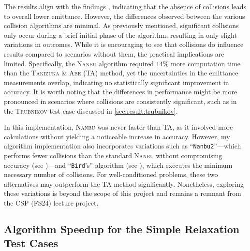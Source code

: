 The results align with the findings \cite[595]{Mitchell2015}, indicating that the absence of collisions leads to overall lower emittance. However, the differences observed between the various collision algorithms are minimal. As previously mentioned, significant collisions only occur during a brief initial phase of the algorithm, resulting in only slight variations in outcomes. While it is encouraging to see that collisions do influence results compared to scenarios without them, the practical implications are limited. Specifically, the \textsc{Nanbu} algorithm required $14\%$ more computation time than the \textsc{Takizuka \& Abe} (TA) method, yet the uncertainties in the emittance measurements overlap, indicating no statistically significant improvement in accuracy. It is worth noting that the differences in performance might be more pronounced in scenarios where collisions are consistently significant, such as in the \textsc{Trubnikov} test case discussed in \ref{sec:result:trubnikov}. 

In this implementation, \textsc{Nanbu} was never faster than TA, as it involved more calculations without yielding a noticeable increase in accuracy. However, my algorithm implementation also incorporates variations such as ``\texttt{Nanbu2}''—which performs fewer collisions than the standard \textsc{Nanbu} without compromising accuracy (see \cite[7]{Dimarco2010})—and ``\texttt{Bird}'s'' algorithm (see \cite[8]{Dimarco2010}), which executes the minimum necessary number of collisions. For well-conditioned problems, these two alternatives may outperform the TA method significantly. Nonetheless, exploring these variations is beyond the scope of this project and remains a remnant from the CSP (FS24) lecture project.


\subsection{Algorithm Speedup for the Simple Relaxation Test Cases}

